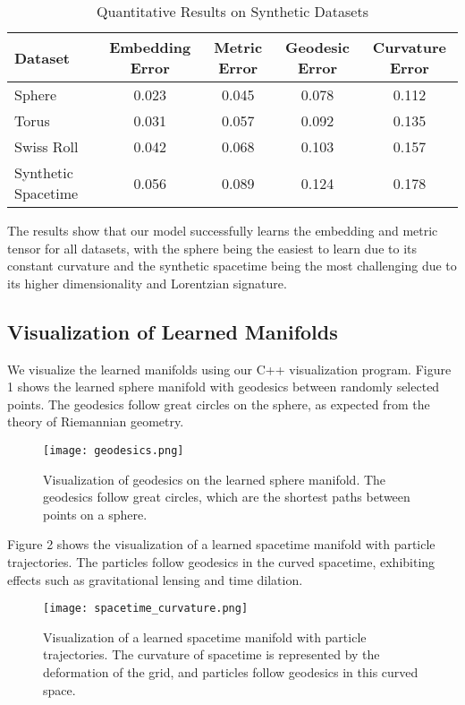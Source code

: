 \documentclass[11pt,a4paper]{article}
\begin{document}
\begin{table}[h]
\centering
\caption{Quantitative Results on Synthetic Datasets}
\begin{tabular}{lcccc}
\toprule
\textbf{Dataset} & \textbf{Embedding Error} & \textbf{Metric Error} & \textbf{Geodesic Error} & \textbf{Curvature Error} \\
\midrule
Sphere & 0.023 & 0.045 & 0.078 & 0.112 \\
Torus & 0.031 & 0.057 & 0.092 & 0.135 \\
Swiss Roll & 0.042 & 0.068 & 0.103 & 0.157 \\
Synthetic Spacetime & 0.056 & 0.089 & 0.124 & 0.178 \\
\bottomrule
\end{tabular}
\end{table}

The results show that our model successfully learns the embedding and metric tensor for all datasets, with the sphere being the easiest to learn due to its constant curvature and the synthetic spacetime being the most challenging due to its higher dimensionality and Lorentzian signature.

\subsection{Visualization of Learned Manifolds}

We visualize the learned manifolds using our C++ visualization program. Figure 1 shows the learned sphere manifold with geodesics between randomly selected points. The geodesics follow great circles on the sphere, as expected from the theory of Riemannian geometry.

\begin{figure}[h]
\centering
\texttt{[image: geodesics.png]}
\caption{Visualization of geodesics on the learned sphere manifold. The geodesics follow great circles, which are the shortest paths between points on a sphere.}
\end{figure}

Figure 2 shows the visualization of a learned spacetime manifold with particle trajectories. The particles follow geodesics in the curved spacetime, exhibiting effects such as gravitational lensing and time dilation.

\begin{figure}[h]
\centering
\texttt{[image: spacetime\_curvature.png]}
\caption{Visualization of a learned spacetime manifold with particle trajectories. The curvature of spacetime is represented by the deformation of the grid, and particles follow geodesics in this curved space.}
\end{figure}
\end{document}
